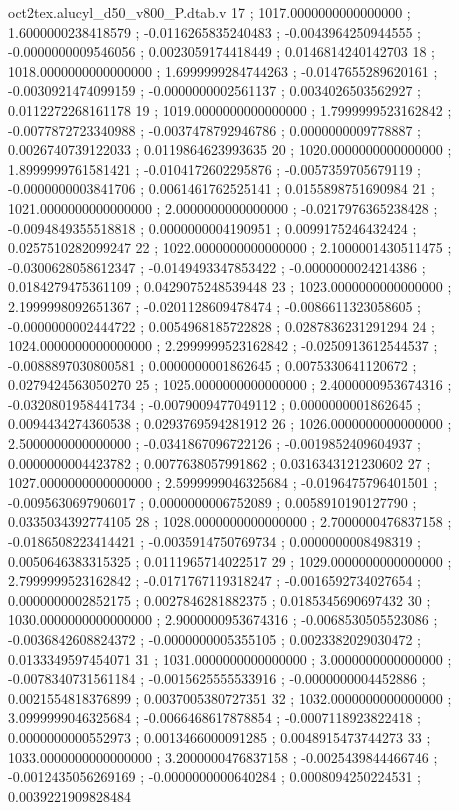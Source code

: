 \begin{filecontents}[overwrite]{oct2tex.alucyl_d50_v800_P.dtab.v}
17 ; 1017.0000000000000000 ; 1.6000000238418579 ; -0.0116265835240483 ; -0.0043964250944555 ; -0.0000000009546056 ; 0.0023059174418449 ; 0.0146814240142703
18 ; 1018.0000000000000000 ; 1.6999999284744263 ; -0.0147655289620161 ; -0.0030921474099159 ; -0.0000000002561137 ; 0.0034026503562927 ; 0.0112272268161178
19 ; 1019.0000000000000000 ; 1.7999999523162842 ; -0.0077872723340988 ; -0.0037478792946786 ; 0.0000000009778887 ; 0.0026740739122033 ; 0.0119864623993635
20 ; 1020.0000000000000000 ; 1.8999999761581421 ; -0.0104172602295876 ; -0.0057359705679119 ; -0.0000000003841706 ; 0.0061461762525141 ; 0.0155898751690984
21 ; 1021.0000000000000000 ; 2.0000000000000000 ; -0.0217976365238428 ; -0.0094849355518818 ; 0.0000000004190951 ; 0.0099175246432424 ; 0.0257510282099247
22 ; 1022.0000000000000000 ; 2.1000001430511475 ; -0.0300628058612347 ; -0.0149493347853422 ; -0.0000000024214386 ; 0.0184279475361109 ; 0.0429075248539448
23 ; 1023.0000000000000000 ; 2.1999998092651367 ; -0.0201128609478474 ; -0.0086611323058605 ; -0.0000000002444722 ; 0.0054968185722828 ; 0.0287836231291294
24 ; 1024.0000000000000000 ; 2.2999999523162842 ; -0.0250913612544537 ; -0.0088897030800581 ; 0.0000000001862645 ; 0.0075330641120672 ; 0.0279424563050270
25 ; 1025.0000000000000000 ; 2.4000000953674316 ; -0.0320801958441734 ; -0.0079009477049112 ; 0.0000000001862645 ; 0.0094434274360538 ; 0.0293769594281912
26 ; 1026.0000000000000000 ; 2.5000000000000000 ; -0.0341867096722126 ; -0.0019852409604937 ; 0.0000000004423782 ; 0.0077638057991862 ; 0.0316343121230602
27 ; 1027.0000000000000000 ; 2.5999999046325684 ; -0.0196475796401501 ; -0.0095630697906017 ; 0.0000000006752089 ; 0.0058910190127790 ; 0.0335034392774105
28 ; 1028.0000000000000000 ; 2.7000000476837158 ; -0.0186508223414421 ; -0.0035914750769734 ; 0.0000000008498319 ; 0.0050646383315325 ; 0.0111965714022517
29 ; 1029.0000000000000000 ; 2.7999999523162842 ; -0.0171767119318247 ; -0.0016592734027654 ; 0.0000000002852175 ; 0.0027846281882375 ; 0.0185345690697432
30 ; 1030.0000000000000000 ; 2.9000000953674316 ; -0.0068530505523086 ; -0.0036842608824372 ; -0.0000000005355105 ; 0.0023382029030472 ; 0.0133349597454071
31 ; 1031.0000000000000000 ; 3.0000000000000000 ; -0.0078340731561184 ; -0.0015625555533916 ; -0.0000000004452886 ; 0.0021554818376899 ; 0.0037005380727351
32 ; 1032.0000000000000000 ; 3.0999999046325684 ; -0.0066468617878854 ; -0.0007118923822418 ; 0.0000000000552973 ; 0.0013466000091285 ; 0.0048915473744273
33 ; 1033.0000000000000000 ; 3.2000000476837158 ; -0.0025439844466746 ; -0.0012435056269169 ; -0.0000000000640284 ; 0.0008094250224531 ; 0.0039221909828484

\end{filecontents}

